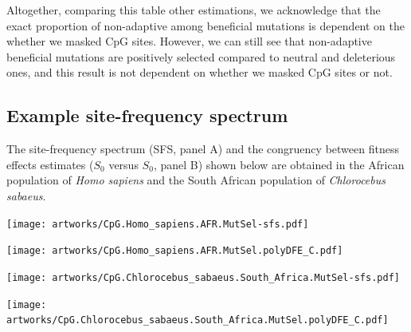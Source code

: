 \documentclass{article}
\newcommand{\Sphy}{S_{0}}
\begin{document}
    Altogether, comparing this table other estimations, we acknowledge that the exact proportion of non-adaptive among beneficial mutations is dependent on the whether we masked CpG sites.
    However, we can still see that non-adaptive beneficial mutations are positively selected compared to neutral and deleterious ones, and this result is not dependent on whether we masked CpG sites or not.

    \newpage

    \subsection{Example site-frequency spectrum}\label{subsec:CpG-expectedDFE}

    The site-frequency spectrum (SFS, panel A) and the congruency between fitness effects estimates ($\Sphy$ versus $\Sphy$, panel B) shown below are obtained in the African population of \textit{Homo sapiens} and the South African population of \textit{Chlorocebus sabaeus}.


    \begin{center}
        \begin{minipage}{0.49\linewidth}
            \texttt{[image: artworks/CpG.Homo\_sapiens.AFR.MutSel-sfs.pdf]}
        \end{minipage}
        \begin{minipage}{0.49\linewidth}
            \texttt{[image: artworks/CpG.Homo\_sapiens.AFR.MutSel.polyDFE\_C.pdf]}
        \end{minipage}
    \end{center}

    \begin{center}
        \begin{minipage}{0.49\linewidth}
            \texttt{[image: artworks/CpG.Chlorocebus\_sabaeus.South\_Africa.MutSel-sfs.pdf]}
        \end{minipage}
        \begin{minipage}{0.49\linewidth}
            \texttt{[image: artworks/CpG.Chlorocebus\_sabaeus.South\_Africa.MutSel.polyDFE\_C.pdf]}
        \end{minipage}
    \end{center}
\end{document}
